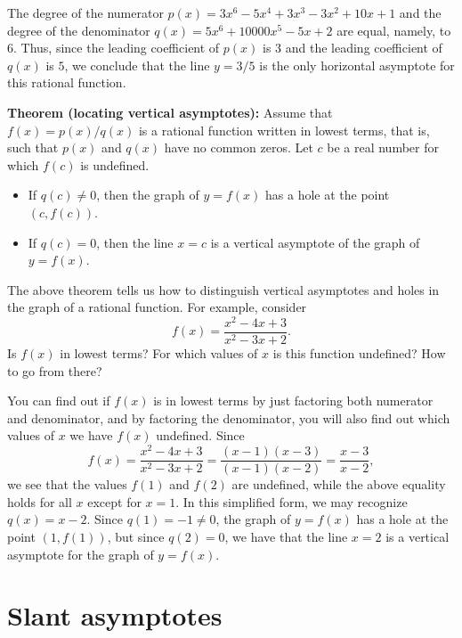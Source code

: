 \documentclass{ximera}
\begin{document}
\begin{explanation}
  The degree of the numerator $p(x) = 3x^6-5x^4+3x^3-3x^2 + 10x + 1$ and the degree of the denominator $q(x) = 5x^6 + 10000x^5 - 5x+2$ are equal, namely, to $6$. Thus, since the leading coefficient of $p(x)$ is $3$ and the leading coefficient of $q(x)$ is $5$, we conclude that the line $y=3/5$ is the only horizontal asymptote for this rational function.
\end{explanation}

\begin{callout}
  {\bf Theorem (locating vertical asymptotes):} Assume that $f(x) = p(x)/q(x)$ is a rational function written in lowest terms, that is, such that $p(x)$ and $q(x)$ have no common zeros. Let $c$ be a real number for which $f(c)$ is undefined.
  \begin{itemize}
  \item If $q(c) \neq 0$, then the graph of $y = f(x)$ has a hole at the point $(c,f(c))$.
  \item If $q(c) = 0$, then the line $x=c$ is a vertical asymptote of the graph of $y=f(x)$.
  \end{itemize}
\end{callout}

The above theorem tells us how to distinguish vertical asymptotes and holes in the graph of a rational function. For example, consider $$  f(x) = \frac{x^2-4x+3}{x^2-3x+2}.  $$Is $f(x)$ in lowest terms? For which values of $x$ is this function undefined? How to go from there?

\begin{explanation}
You can find out if $f(x)$ is in lowest terms by just factoring both numerator and denominator, and by factoring the denominator, you will also find out which values of $x$ we have $f(x)$ undefined. Since $$   f(x) = \frac{x^2-4x+3}{x^2-3x+2} = \frac{(x-1)(x-3)}{(x-1)(x-2)} = \frac{x-3}{x-2},  $$we see that the values $f(1)$ and $f(2)$ are undefined, while the above equality holds for all $x$ except for $x=1$. In this simplified form, we may recognize $q(x) = x-2$. Since $q(1) = -1 \neq 0$, the graph of $y=f(x)$ has a hole at the point $(1,f(1))$, but since $q(2) = 0$, we have that the line $x=2$ is a vertical asymptote for the graph of $y=f(x)$.
\end{explanation}

\section{Slant asymptotes}
\end{document}

